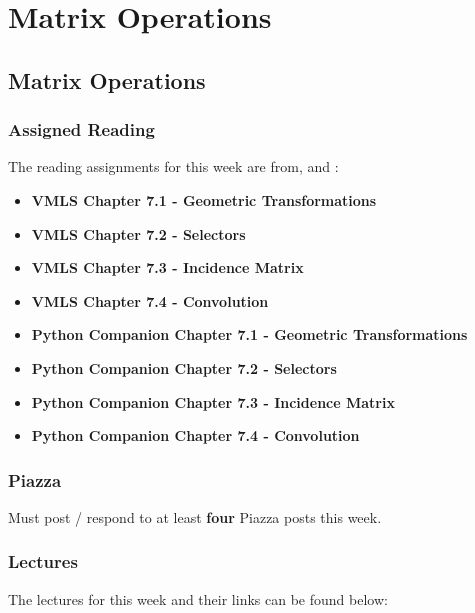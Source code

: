 \clearpage

\renewcommand{\ChapTitle}{Matrix Operations}
\renewcommand{\SectionTitle}{Matrix Operations}

\chapter{\ChapTitle}
\section{\SectionTitle}

\subsection{Assigned Reading}

The reading assignments for this week are from, \VMLS \hspace*{1pt} and \PyCap:

\begin{itemize}
    \item \textbf{VMLS Chapter 7.1 - Geometric Transformations}
    \item \textbf{VMLS Chapter 7.2 - Selectors}
    \item \textbf{VMLS Chapter 7.3 - Incidence Matrix}
    \item \textbf{VMLS Chapter 7.4 - Convolution}
    \item \textbf{Python Companion Chapter 7.1 - Geometric Transformations}
    \item \textbf{Python Companion Chapter 7.2 - Selectors}
    \item \textbf{Python Companion Chapter 7.3 - Incidence Matrix}
    \item \textbf{Python Companion Chapter 7.4 - Convolution}
\end{itemize}

\subsection{Piazza}

Must post / respond to at least \textbf{four} Piazza posts this week.

\subsection{Lectures}

The lectures for this week and their links can be found below:

